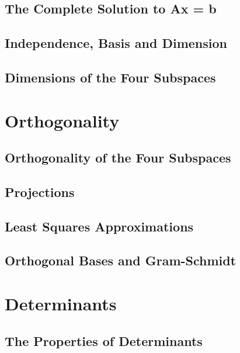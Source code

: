 \documentclass{book}
\begin{document}
\section{The Complete Solution to Ax = b}

\section{Independence, Basis and Dimension}

\section{Dimensions of the Four Subspaces}










\chapter{Orthogonality}
\section{Orthogonality of the Four Subspaces}

\section{Projections}

\section{Least Squares Approximations}

\section{Orthogonal Bases and Gram-Schmidt}







\chapter{Determinants}
\section{The Properties of Determinants}
\end{document}
